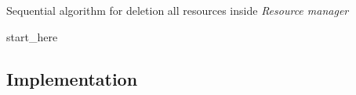 \begin{algorithm}[H]
\label{01:alg:dsdsd+}
\caption{Sequential algorithm for deletion all resources inside \emph{Resource manager}}

    \begin{algorithmic}[1]
        \State start\_here
    \end{algorithmic}
\end{algorithm}


\subsection*{Implementation}